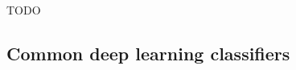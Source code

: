 

TODO


\subsection{Common deep learning classifiers}
\label{subsec:processing_signals_ml_and_dl_dl_classifiers}







